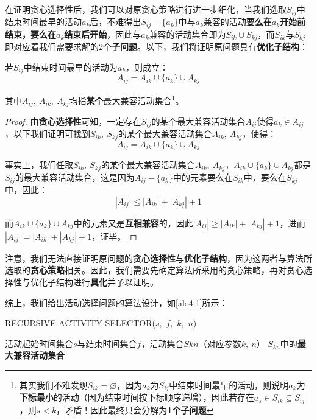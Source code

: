 \documentclass[12pt,a4paper,violet,oneside]{bbe}
\begin{document}
在证明贪心选择性后，我们可以对原贪心策略进行进一步细化，当我们选取$S_{ij}$中结束时间最早的活动$a_k$后，不难得出$S_{ij}-\{a_k\}$中与$a_k$兼容的活动\textbf{要么在$a_k$开始前结束，要么在$a_k$结束后开始}，因此与$a_k$兼容的活动集合即为$S_{ik}\cup S_{kj}$，而$S_{ik}$与$S_{kj}$即对应着我们需要求解的2个\textbf{子问题}。以下，我们将证明原问题具有\textbf{优化子结构}：
\begin{lemma}
	若$S_{ij}$中结束时间最早的活动为$a_k$，则成立：
	$$
	A_{ij}=A_{ik}\cup\{a_k\}\cup A_{kj}
	$$
	
	其中$A_{ij},~A_{ik},~A_{kj}$均指\textbf{某个}最大兼容活动集合\footnote{其实我们不难发现$S_{ik}=\varnothing$，因为$a_k$为$S_{ij}$中结束时间最早的活动，则说明$a_k$为\textbf{下标最小}的活动（因为结束时间按下标顺序递增），因此若存在$a_s\in S_{ik}\subseteq S_{ij}$，则$s<k$，矛盾！因此最终只会分解为\textbf{1个子问题}}。
\end{lemma}

\begin{proof}
	由\textbf{贪心选择性}可知，一定存在$S_{ij}$的某个最大兼容活动集合$A_{ij}$使得$a_k\in A_{ij}$，以下我们证明可找到$S_{ik},~S_{kj}$的某个最大兼容活动集合$A_{ik},~A_{kj}$，使得：
	$$
		A_{ij}=A_{ik}\cup\{a_k\}\cup A_{kj}
	$$
	
	事实上，我们任取$S_{ik},~S_{kj}$的某个最大兼容活动集合$A_{ik},~A_{kj}$，$A_{ik}\cup\{a_k\}\cup A_{kj}$都是$S_{ij}$的最大兼容活动集合，这是因为$A_{ij}-\{a_k\}$中的元素要么在$S_{ik}$中，要么在$S_{kj}$中，因此：
	$$
	|A_{ij}|\leqslant|A_{ik}|+|A_{kj}|+1
	$$
	
	而$A_{ik}\cup\{a_k\}\cup A_{kj}$中的元素又是\textbf{互相兼容}的，因此$|A_{ij}|\geqslant|A_{ik}|+|A_{kj}|+1$，进而$|A_{ij}|=|A_{ik}|+|A_{kj}|+1$，证毕。

\end{proof}

\begin{remark}
	注意，我们无法直接证明原问题的\textbf{贪心选择性}与\textbf{优化子结构}，因为这两者与算法所选取的\textbf{贪心策略}相关。因此，我们需要先确定算法所采用的贪心策略，再对贪心选择性与优化子结构进行\textbf{具化}并予以证明。
\end{remark}

综上，我们给出活动选择问题的算法设计，如\cref{alo4.1}所示：
\\
\begin{algorithm}[H]
	\caption{RECURSIVE-ACTIVITY-SELECTOR($s$,~$f$,~$k$,~$n$)}
	\label{alo4.1}
	\begin{algorithmic}[1] 
		\Require 活动起始时间集合$s$与结束时间集合$f$，活动集合$S{kn}$（对应参数$k,~n$）
		\Ensure $S_{kn}$中的\textbf{最大兼容活动集合}\textcolor{blue}{}
		\textcolor{blue}{}
		\EndWhile
		\Else
		\State{\Return$\varnothing$}
		\EndIf
	\end{algorithmic} 
\end{algorithm}
\end{document}
